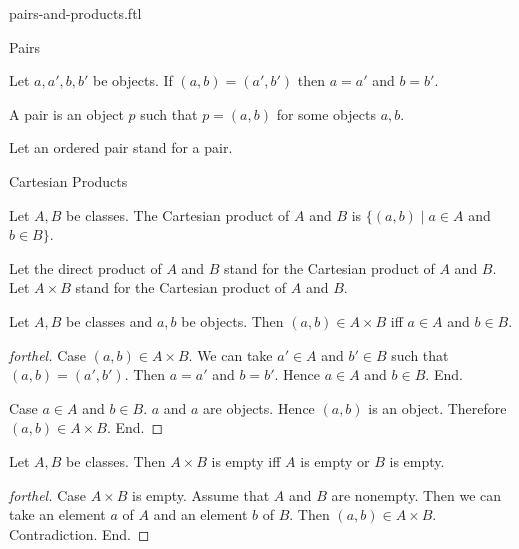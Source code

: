 \documentclass{naproche-library}
\begin{document}
\begin{smodule}[title=Ordered Pairs and Cartesian Products]{pairs-and-products.ftl}

\begin{sfragment}{Pairs}
  \begin{axiom}[forthel,id=FOUNDATIONS_04_8464577431863296]
    Let $a, a', b, b'$ be objects.
    If $(a, b) = (a', b')$ then $a = a'$ and $b = b'$.
  \end{axiom}

  \begin{definition}[forthel,id=FOUNDATIONS_04_4782386822774784]
    A pair is an object $p$ such that $p = (a, b)$ for some objects $a, b$.

    Let an ordered pair stand for a pair.
  \end{definition}
\end{sfragment}

\begin{sfragment}{Cartesian Products}
  \begin{definition}[forthel,id=FOUNDATIONS_04_2877806274936832]
    Let $A, B$ be classes.
    The Cartesian product of $A$ and $B$ is $\{ (a, b) \mid a \in A$ and $b \in B \}$.

    Let the direct product of $A$ and $B$ stand for  the Cartesian product of $A$ and $B$.
    Let $A \times B$ stand for the Cartesian product of $A$ and $B$.
  \end{definition}

  \begin{proposition}[forthel,id=FOUNDATIONS_04_1581118511906816]
    Let $A, B$ be classes and $a, b$ be objects.
    Then $(a, b) \in A \times B$ iff $a \in A$ and $b \in B$.
  \end{proposition}
  \begin{proof}[forthel]
    Case $(a, b) \in A \times B$.
      We can take $a' \in A$ and $b' \in B$ such that $(a, b) = (a', b')$.
      Then $a = a'$ and $b = b'$.
      Hence $a \in A$ and $b \in B$.
    End.

    Case $a \in A$ and $b \in B$.
      $a$ and $a$ are objects.
      Hence $(a, b)$ is an object.
      Therefore $(a, b) \in A \times B$.
    End.
  \end{proof}

  \begin{proposition}[forthel,id=FOUNDATIONS_04_2198552029691904]
    Let $A, B$ be classes.
    Then $A \times B$ is empty iff $A$ is empty or $B$ is empty.
  \end{proposition}
  \begin{proof}[forthel]
    Case $A \times B$ is empty.
      Assume that $A$ and $B$ are nonempty.
      Then we can take an element $a$ of $A$ and an element $b$ of $B$.
      Then $(a, b) \in A \times B$.
      Contradiction.
    End.


\end{proof}
\end{sfragment}
\end{smodule}
\end{document}

